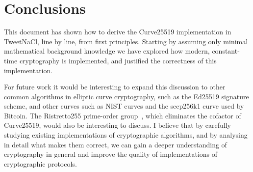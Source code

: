 \documentclass{article}
\begin{document}
\section{Conclusions}

This document has shown how to derive the Curve25519 implementation in TweetNaCl, line by line, from first principles.
Starting by assuming only minimal mathematical background knowledge we have explored how modern, constant-time cryptography is implemented, and justified the correctness of this implementation.

For future work it would be interesting to expand this discussion to other common algorithms in elliptic curve cryptography, such as the Ed25519 signature scheme, and other curves such as NIST curves and the secp256k1 curve used by Bitcoin.
The Ristretto255 prime-order group~\cite{Ristretto255}, which eliminates the cofactor of Curve25519, would also be interesting to discuss.
I believe that by carefully studying existing implementations of cryptographic algorithms, and by analysing in detail what makes them correct, we can gain a deeper understanding of cryptography in general and improve the quality of implementations of cryptographic protocols.





\newpage


\end{document}
